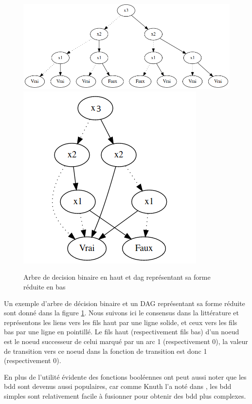 \documentclass[french]{article}
\begin{document}
\begin{figure}[h!]
    \centering
    \includegraphics[scale=0.4]{bdd ex1.png}
    \includegraphics[scale=0.4]{robdd ex1.png}
    \caption{Arbre de decision binaire en haut et dag représentant sa forme réduite en bas}
    \label{fig:ROBDD1}
\end{figure}
\vspace{5mm} 

Un exemple d'arbre de décision binaire et un DAG représentant sa forme réduite sont donné dans la figure \ref{fig:ROBDD1}. Nous suivons ici le consensus dans la littérature et représentons les liens vers les fils haut par une ligne solide, et ceux vers les fils bas par une ligne en pointillé. Le fils haut (respectivement fils bas) d'un noeud est le noeud successeur de celui marqué par un arc 1 (respectivement 0), la valeur de transition vers ce noeud dans la fonction de transition est donc 1 (respectivement 0).\medskip

En plus de l'utilité évidente des fonctions booléennes ont peut aussi noter que les bdd sont devenus aussi populaires, car comme Knuth l'a noté dans \cite{knuth}, les bdd simples sont relativement facile à fusionner pour obtenir des bdd plus complexes.\medskip
\end{document}
